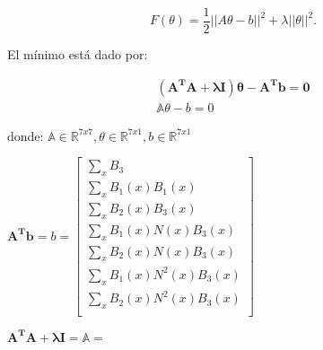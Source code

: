 \begin{equation}
F(\theta) = \frac{1}{2}||A\theta - b||^{2} + \lambda||\theta||^{2}.
\end{equation}

El mínimo está dado por:

\begin{equation}
\begin{split}
\mathbf{(A^{T}A + \lambda I)\theta - A^{T}b = 0}\\
\mathbb{A}\theta - b = 0
\end{split}
\end{equation}

donde: $\mathbb{A} \in \mathbb{R}^{7x7}, \theta \in \mathbb{R}^{7x1}, b \in \mathbb{R}^{7x1}$

\begin{center}
$\mathbf{A^{T}b} = b = \begin{bmatrix}
\sum_{x} B_{3} \\
\sum_{x} B_{1}(x) B_{1}(x) \\
\sum_{x} B_{2}(x) B_{3}(x) \\
\sum_{x} B_{1}(x) N(x)  B_{3}(x) \\
\sum_{x} B_{2}(x) N(x)  B_{3}(x) \\	
\sum_{x} B_{1}(x) N^{2}(x)  B_{3}(x) \\
\sum_{x} B_{2}(x) N^{2}(x)  B_{3}(x) \\
\end{bmatrix}$
\end{center}

$\mathbf{A^{T}A + \lambda I} = \mathbb{A} = $

